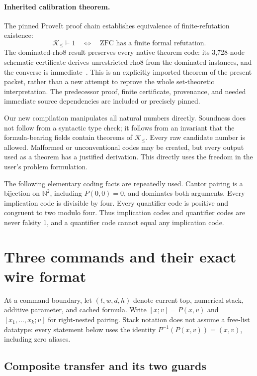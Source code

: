 \documentclass[11pt]{article}
\newcommand{\N}{\mathbb N}
\newcommand{\Kdom}{\mathcal K_{\le}}
\begin{document}
\paragraph{Inherited calibration theorem.}
The pinned ProveIt proof chain establishes equivalence of finite-refutation existence:
\[
 \Kdom\vdash 1
 \quad\Longleftrightarrow\quad
 \text{ZFC has a finite formal refutation}.
\]
The dominated-rho8 result preserves every native theorem code: its 3,728-node schematic certificate derives unrestricted rho8 from the dominated instances, and the converse is immediate~\cite{dominated}. This is an explicitly imported theorem of the present packet, rather than a new attempt to reprove the whole set-theoretic interpretation. The predecessor proof, finite certificate, provenance, and needed immediate source dependencies are included or precisely pinned.

Our new compilation manipulates all natural numbers directly. Soundness does not follow from a syntactic type check; it follows from an invariant that the formula-bearing fields contain theorems of $\Kdom$. Every raw candidate number is allowed. Malformed or unconventional codes may be created, but every output used as a theorem has a justified derivation. This directly uses the freedom in the user's problem formulation.

The following elementary coding facts are repeatedly used. Cantor pairing is a bijection on $\N^2$, including $P(0,0)=0$, and dominates both arguments. Every implication code is divisible by four. Every quantifier code is positive and congruent to two modulo four. Thus implication codes and quantifier codes are never falsity 1, and a quantifier code cannot equal any implication code.

\section{Three commands and their exact wire format}
\label{sec:commands}

At a command boundary, let $(t,w,d,h)$ denote current top, numerical stack, additive parameter, and cached formula. Write $[x;v]=P(x,v)$ and $[x_1,\ldots,x_k;v]$ for right-nested pairing. Stack notation does not assume a free-list datatype: every statement below uses the identity $P^{-1}(P(x,v))=(x,v)$, including zero aliases.

\subsection{Composite transfer and its two guards}
\end{document}
